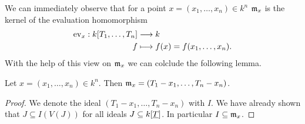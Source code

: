 \documentclass[../notes.tex]{subfiles}
\begin{document}
\smallskip
\noindent
We can immediately observe that for a point $x = (x_1, \dots, x_n) \in k^n$
${\mathfrak{m}}_x$ is the kernel of the evaluation homomorphism
\begin{align*}
  \operatorname{ev}_x : k[T_1, \dots, T_n] & \longrightarrow k \\
  f & \longmapsto f(x) = f(x_1, \dots, x_n).
\end{align*}
With the help of this view on ${\mathfrak{m}}_x$ we can colclude the following lemma.

\smallskip
\begin{lemm}{}{}
  Let $x = (x_1, \dots, x_n) \in k^n$. Then ${\mathfrak{m}}_x = (T_1 - x_1, \dots, T_n - x_n)$.
\end{lemm}

\begin{proof}
  We denote the ideal $(T_1 - x_1, \dots, T_n - x_n)$ with $I$. We have already shown that
  $J \subseteq I(V(J))$ for all ideals $J \subseteq k[{\underline{T}}]$. In particular $I \subseteq {\mathfrak{m}}_x$.
  
\end{proof}
\end{document}
